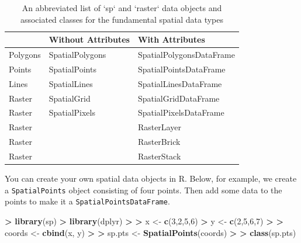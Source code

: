 \documentclass[
]{krantz}
\makeatletter
\newenvironment{Shaded}{\begin{snugshade}}{\end{snugshade}}
\newcommand{\DecValTok}[1]{\textcolor[rgb]{0.06,0.06,0.06}{#1}}
\newcommand{\ErrorTok}[1]{\textcolor[rgb]{0.14,0.14,0.14}{\textbf{#1}}}
\newcommand{\KeywordTok}[1]{\textcolor[rgb]{0.27,0.27,0.27}{\textbf{#1}}}
\newcommand{\NormalTok}[1]{#1}
\newcommand{\OperatorTok}[1]{\textcolor[rgb]{0.43,0.43,0.43}{\textbf{#1}}}
\newcommand{\StringTok}[1]{\textcolor[rgb]{0.5,0.5,0.5}{#1}}
\newenvironment{kframe}{%
\medskip{}
\setlength{\fboxsep}{.8em}
 \def\at@end@of@kframe{}%
 \ifinner\ifhmode%
  \def\at@end@of@kframe{\end{minipage}}%
  \begin{minipage}{\columnwidth}%
 \fi\fi%
 \def\FrameCommand##1{\hskip\@totalleftmargin \hskip-\fboxsep
 \colorbox{shadecolor}{##1}\hskip-\fboxsep
     \hskip-\linewidth \hskip-\@totalleftmargin \hskip\columnwidth}%
 \MakeFramed {\advance\hsize-\width
   \@totalleftmargin\z@ \linewidth\hsize
   \@setminipage}}%
 {\par\unskip\endMakeFramed%
 \at@end@of@kframe}
\renewenvironment{Shaded}{\begin{kframe}}{\end{kframe}}
\makeatother
\begin{document}
\begin{table}[t]

\caption{\label{tab:spatialObjs}An abbreviated list of `sp` and `raster` data objects and associated classes for the fundamental spatial data types}
\centering
\begin{tabular}{lll}
\toprule
 & Without Attributes & With Attributes\\
\midrule
Polygons & SpatialPolygons & SpatialPolygonsDataFrame\\
Points & SpatialPoints & SpatialPointsDataFrame\\
Lines & SpatialLines & SpatialLinesDataFrame\\
Raster & SpatialGrid & SpatialGridDataFrame\\
Raster & SpatialPixels & SpatialPixelsDataFrame\\
\addlinespace
Raster &  & RasterLayer\\
Raster &  & RasterBrick\\
Raster &  & RasterStack\\
\bottomrule
\end{tabular}
\end{table}

You can create your own spatial data objects in R. Below, for example, we create a \texttt{SpatialPoints} object consisting of four points. Then add some data to the points to make it a \texttt{SpatialPointsDataFrame}.

\begin{Shaded}
\begin{Highlighting}[]
\OperatorTok{\textgreater{}}\StringTok{ }\KeywordTok{library}\NormalTok{(sp)}
\OperatorTok{\textgreater{}}\StringTok{ }\KeywordTok{library}\NormalTok{(dplyr)}
\OperatorTok{\textgreater{}}\StringTok{ }
\ErrorTok{\textgreater{}}\StringTok{ }\NormalTok{x \textless{}{-}}\StringTok{ }\KeywordTok{c}\NormalTok{(}\DecValTok{3}\NormalTok{,}\DecValTok{2}\NormalTok{,}\DecValTok{5}\NormalTok{,}\DecValTok{6}\NormalTok{)}
\OperatorTok{\textgreater{}}\StringTok{ }\NormalTok{y \textless{}{-}}\StringTok{ }\KeywordTok{c}\NormalTok{(}\DecValTok{2}\NormalTok{,}\DecValTok{5}\NormalTok{,}\DecValTok{6}\NormalTok{,}\DecValTok{7}\NormalTok{)}
\OperatorTok{\textgreater{}}\StringTok{ }
\ErrorTok{\textgreater{}}\StringTok{ }\NormalTok{coords \textless{}{-}}\StringTok{ }\KeywordTok{cbind}\NormalTok{(x, y)}
\OperatorTok{\textgreater{}}\StringTok{ }
\ErrorTok{\textgreater{}}\StringTok{ }\NormalTok{sp.pts \textless{}{-}}\StringTok{ }\KeywordTok{SpatialPoints}\NormalTok{(coords)}
\OperatorTok{\textgreater{}}\StringTok{ }
\ErrorTok{\textgreater{}}\StringTok{ }\KeywordTok{class}\NormalTok{(sp.pts)}
\end{Highlighting}
\end{Shaded}
\end{document}
